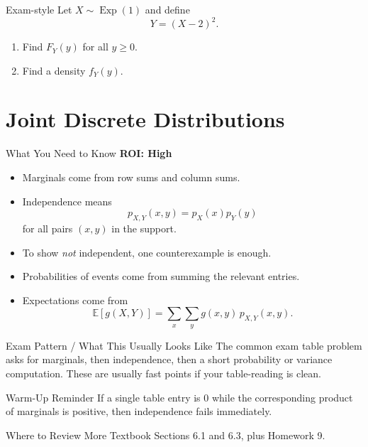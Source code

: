 \documentclass[12pt]{article}
\newcommand{\EE}{\mathbb{E}}
\newcommand{\Exp}{\operatorname{Exp}}
\newcommand{\writespace}[1]{\vspace*{#1}}
\newcommand{\xlongws}{\writespace{4.1cm}}
\newcommand{\roiline}[1]{\textbf{ROI: #1}}
\newcounter{problem}[section]
\begin{document}
\begin{practiceproblem}{Exam-style}
Let $X\sim\Exp(1)$ and define
\[
  Y=(X-2)^2.
\]
\begin{enumerate}
  \item Find $F_Y(y)$ for all $y\ge 0$.
  \item Find a density $f_Y(y)$.
\end{enumerate}
\end{practiceproblem}
\xlongws

\clearpage

\section{Joint Discrete Distributions}

\begin{summarybox}{What You Need to Know}
\roiline{High}
\begin{itemize}
  \item Marginals come from row sums and column sums.
  \item Independence means
  \[
    p_{X,Y}(x,y)=p_X(x)p_Y(y)
  \]
  for all pairs $(x,y)$ in the support.
  \item To show \emph{not} independent, one counterexample is enough.
  \item Probabilities of events come from summing the relevant entries.
  \item Expectations come from
  \[
    \EE[g(X,Y)]=\sum_x\sum_y g(x,y)\,p_{X,Y}(x,y).
  \]
\end{itemize}
\end{summarybox}

\begin{patternbox}{Exam Pattern / What This Usually Looks Like}
The common exam table problem asks for marginals, then independence, then a short probability or variance computation. These are usually fast points if your table-reading is clean.
\end{patternbox}

\begin{examplebox}{Warm-Up Reminder}
If a single table entry is $0$ while the corresponding product of marginals is positive, then independence fails immediately.
\end{examplebox}

\begin{reviewbox}{Where to Review More}
Textbook Sections 6.1 and 6.3, plus Homework 9.
\end{reviewbox}
\end{document}
